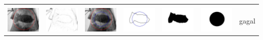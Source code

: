 \begin{table}[H]
\begin{tabular}{|m{0.7in}|m{0.7in}|m{0.7in}|m{0.7in}|m{0.7in}|m{0.7in}|m{0.7in}|}
		&  &  & & & &  \\
		\includegraphics[width=0.7in]{dataset/dataset_3/luka_merah/ready/14_integer_init.jpg}&
		\includegraphics[width=0.7in]{dataset/dataset_3/luka_merah/ready/14_integer_ext.jpg}&
		\includegraphics[width=0.7in]{dataset/dataset_3/luka_merah/ready/14_integer_result.jpg}&
		\includegraphics[width=0.7in]{dataset/dataset_3/luka_merah/ready/14_gt_r_integer.jpg}&
		\includegraphics[width=0.7in]{dataset/dataset_3/luka_merah/ready/14_r.jpg}&
		\includegraphics[width=0.7in]{dataset/dataset_3/luka_merah/ready/14_integer_r.jpg}&
		gagal\\
		\hline
		

\end{tabular}
\end{table}
